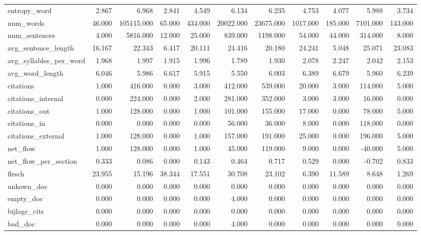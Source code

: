 \begin{tabular}{lrrrrrrrrrr}
\cline{1-11}
entropy\_word & 2.867 & 6.968 & 2.841 & 4.549 & 6.134 & 6.235 & 4.753 & 4.077 & 5.988 & 3.734 \\
\cline{1-11}
num\_words & 46.000 & 105115.000 & 65.000 & 434.000 & 20022.000 & 23675.000 & 1017.000 & 185.000 & 7101.000 & 143.000 \\
\cline{1-11}
num\_sentences & 4.000 & 5816.000 & 12.000 & 25.000 & 839.000 & 1198.000 & 54.000 & 44.000 & 314.000 & 8.000 \\
\cline{1-11}
avg\_sentence\_length & 16.167 & 22.343 & 6.417 & 20.111 & 24.416 & 20.180 & 24.241 & 5.048 & 25.071 & 23.083 \\
\cline{1-11}
avg\_syllables\_per\_word & 1.968 & 1.997 & 1.915 & 1.996 & 1.789 & 1.930 & 2.078 & 2.247 & 2.042 & 2.153 \\
\cline{1-11}
avg\_word\_length & 6.046 & 5.986 & 6.617 & 5.915 & 5.550 & 6.003 & 6.389 & 6.679 & 5.960 & 6.239 \\
\cline{1-11}
citations & 1.000 & 416.000 & 0.000 & 3.000 & 412.000 & 539.000 & 20.000 & 3.000 & 114.000 & 5.000 \\
\cline{1-11}
citations\_internal & 0.000 & 224.000 & 0.000 & 2.000 & 281.000 & 352.000 & 3.000 & 3.000 & 16.000 & 0.000 \\
\cline{1-11}
citations\_out & 1.000 & 128.000 & 0.000 & 1.000 & 101.000 & 155.000 & 17.000 & 0.000 & 78.000 & 5.000 \\
\cline{1-11}
citations\_in & 0.000 & 0.000 & 0.000 & 0.000 & 56.000 & 36.000 & 8.000 & 0.000 & 118.000 & 0.000 \\
\cline{1-11}
citations\_external & 1.000 & 128.000 & 0.000 & 1.000 & 157.000 & 191.000 & 25.000 & 0.000 & 196.000 & 5.000 \\
\cline{1-11}
net\_flow & 1.000 & 128.000 & 0.000 & 1.000 & 45.000 & 119.000 & 9.000 & 0.000 & -40.000 & 5.000 \\
\cline{1-11}
net\_flow\_per\_section & 0.333 & 0.086 & 0.000 & 0.143 & 0.464 & 0.717 & 0.529 & 0.000 & -0.702 & 0.833 \\
\cline{1-11}
flesch & 23.955 & 15.196 & 38.344 & 17.551 & 30.708 & 23.102 & 6.390 & 11.589 & 8.648 & 1.269 \\
\cline{1-11}
unkown\_doc & 0.000 & 0.000 & 0.000 & 0.000 & 0.000 & 0.000 & 0.000 & 0.000 & 0.000 & 0.000 \\
\cline{1-11}
empty\_doc & 0.000 & 0.000 & 0.000 & 0.000 & 4.000 & 0.000 & 0.000 & 0.000 & 0.000 & 0.000 \\
\cline{1-11}
bijlage\_cits & 0.000 & 0.000 & 0.000 & 0.000 & 0.000 & 0.000 & 0.000 & 0.000 & 0.000 & 0.000 \\
\cline{1-11}
bad\_doc & 0.000 & 0.000 & 0.000 & 0.000 & 4.000 & 0.000 & 0.000 & 0.000 & 0.000 & 0.000 \\
\cline{1-11}
\bottomrule
\end{tabular}
